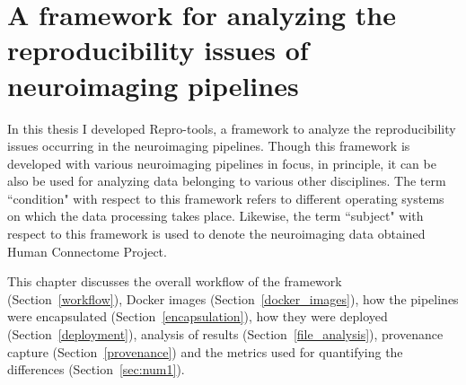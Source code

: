 \chapter{A framework for analyzing the reproducibility issues of neuroimaging pipelines}\label{framework}
In this thesis I developed Repro-tools, a framework to analyze the 
reproducibility issues occurring in the neuroimaging pipelines. Though 
this framework is developed with various neuroimaging pipelines in 
focus, in principle, it can be also be used for analyzing data 
belonging to various other disciplines. The term ``condition" with 
respect to this framework refers to different operating systems on 
which the data processing takes place. Likewise, the term ``subject" 
with respect to this framework is used to denote the neuroimaging data obtained Human Connectome Project. 


This chapter discusses the overall workflow of the framework (Section~\ref{workflow}), Docker images (Section~\ref{docker_images}), how the pipelines were encapsulated (Section~\ref{encapsulation}), how they were deployed (Section~\ref{deployment}), analysis of results (Section~\ref{file_analysis}), provenance capture (Section~\ref{provenance}) and the metrics used for quantifying the differences (Section~\ref{sec:num1}).




